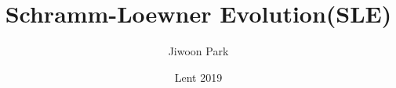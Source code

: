 \documentclass[12pt,a4paper]{article}
\DeclarePairedDelimiter\bignorm{\lVert}{\rVert}
\newcommand{\doublerule}[1][.4pt]{%
  \noindent
  \makebox[0pt][l]{\rule[.7ex]{\linewidth}{#1}}%
  \rule[.3ex]{\linewidth}{#1}}
\begin{document}
\title{Schramm-Loewner Evolution(SLE)}
\author{Jiwoon Park}
\date{Lent 2019}

\maketitle

\newcommand{\latinmodern}[1]{{\fontfamily{lmss}\selectfont
\textbf{#1}
}}

\newcommand{\thm}{\latinmodern{Theorem) }}
\newcommand{\thmnum}[1]{\latinmodern{Theorem #1) }}
\newcommand{\defi}{\latinmodern{Definition) }}
\newcommand{\definum}[1]{\latinmodern{Definition #1) }}
\newcommand{\lem}{\latinmodern{Lemma) }}
\newcommand{\lemnum}[1]{\latinmodern{Lemma #1) }}
\newcommand{\prop}{\latinmodern{Proposition) }}
\newcommand{\propnum}[1]{\latinmodern{Proposition #1) }}
\newcommand{\corr}{\latinmodern{Corollary) }}
\newcommand{\corrnum}[1]{\latinmodern{Corollary #1) }}
\newcommand{\pf}{\textbf{proof) }}
\newcommand{\fact}{\latinmodern{Fact : }}


\newcommand{\lap}{\triangle} %
\renewcommand{\s}{\vspace{10pt}}
\newcommand{\bull}{$\bullet$}
\newcommand{\sta}{$\star$}
\newcommand{\reals}{\mathbb{R}}

\newcommand{\eop}{\hfill  \textsl{(End of proof)} $\square$} %
\newcommand{\eos}{\hfill  \textsl{(End of statement)} $\square$} %
\newcommand{\charac}{\mathrel{\raisebox{0pt}{\scalebox{1}[1]{$1$}} \mkern-5.5mu \raisebox{0.04pt}{\scalebox{1}[1]{$\_$}} \mkern-5.5mu\raisebox{2.3pt}{\scalebox{1}[0.68]{$\bm{|}$}} }}

\newcommand{\call}[1]{\quad \cdots\cdots\cdots\,\,(#1)}

\newcommand{\hh}{\text{\texththeng}}

\newcommand{\norms}[2]{\bignorm[\big]{#1}_{#2}}
\newcommand{\snorms}[2]{\bignorm[\small]{#1}_{#2}}
\newcommand{\abs}[1]{\big| #1 \big|}
\newcommand{\avg}{\mathbb{E}}
\newcommand{\prob}{\mathbb{P}}
\newcommand{\borel}{\mathscr{B}}
\newcommand{\EE}{\mathscr{E}}
\newcommand{\FF}{\mathscr{F}}
\newcommand{\pa}{\partial}
\renewcommand{\H}{\mathbb{H}}
\newcommand{\D}{\mathbb{D}}
\newcommand{\sle}[1]{\text{SLE}_{#1}}

\renewcommand{\vec}{\underline}
\renewcommand{\bar}{\overline}

\def\doubleunderline#1{\underline{\underline{#1}}}

\newcommand{\newday}{\doublerule[0.5pt]}
\newcommand{\digression}{**********************************************************************************************}
\end{document}
